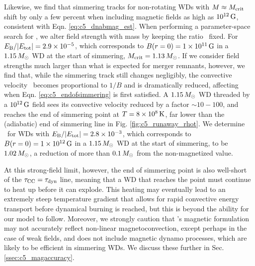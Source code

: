 Likewise, we find that simmering tracks for non-rotating WDs with $M\approx\Mcrit$ shift by only a few percent when including magnetic fields as high as $10^{12}\,\mathrm{G}$, consistent with Eqn. \ref{eq:c5_dnabmag_est}.  When performing a parameter-space search for \Mcrit, we alter field strength with mass by keeping the ratio \EBEtot\ fixed.  For $\EBEtot = 2.9\times10^{-5}$, which corresponds to $B(r=0) = 1\times10^{11}\,\mathrm{G}$ in a $1.15\,\Msun$ WD at the start of simmering, $\Mcrit = 1.13\,\Msun$.  If we consider field strengths much larger than what is expected for merger remnants, however, we find that, while the simmering track still changes negligibly, the convective velocity \vconv\ becomes proportional to $1/B$ and is dramatically reduced, affecting when Eqn. \ref{eq:c5_endofsimmering} is first satisfied.  A $1.15\,\Msun$ WD threaded by a $10^{12}\,\mathrm{G}$ field sees its convective velocity reduced by a factor $\sim 10 - 100$, and reaches the end of simmering point at $T = 8\times10^8\,\mathrm{K}$, far lower than the (adiabatic) end of simmering line in Fig. \ref{fig:c5_runaway_rhot}.  We determine \Mcrit\ for WDs with $\EBEtot = 2.8\times10^{-3}$, which corresponds to $B(r=0) = 1\times10^{12}\,\mathrm{G}$ in a $1.15\,\Msun$ WD at the start of simmering, to be $1.02\,\Msun$, a reduction of more than $0.1\,\Msun$ from the non-magnetized value.

At this strong-field limit, however, the end of simmering point is also well-short of the $\taucc = \taudyn$ line, meaning that a WD that reaches the point must continue to heat up before it can explode.  This heating may eventually lead to an extremely steep temperature gradient that allows for rapid convective energy transport before dynamical burning is reached, but this is beyond the ability for our model to follow.  Moreover, we strongly caution that \citeal{stev79}'s magnetic formulation may not accurately reflect non-linear magnetoconvection, except perhaps in the case of weak fields, and does not include magnetic dynamo processes, which are likely to be efficient in simmering WDs.  We discuss these further in Sec. \ref{ssec:c5_magaccuracy}.





